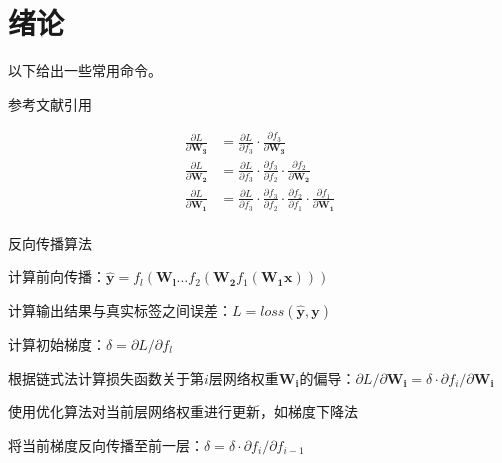 \chapter{绪论}

以下给出一些常用命令。

参考文献引用\cite{abdar_uncertainty_2021, baumgartner_exploration_2018, ackley_learning_1985}

\begin{equation}
    \label{equ:basic_chain_rule}
    \begin{split}
        \frac{\partial L}{\partial \boldsymbol{W_3}} &= \frac{\partial L}{\partial f_3} \cdot \frac{\partial f_3}{\partial \boldsymbol{W_3}} \\
        \frac{\partial L}{\partial \boldsymbol{W_2}} &= \frac{\partial L}{\partial f_3} \cdot \frac{\partial f_3}{\partial f_2} \cdot \frac{\partial f_2}{\partial \boldsymbol{W_2}}  \\
        \frac{\partial L}{\partial \boldsymbol{W_1}} &= \frac{\partial L}{\partial f_3} \cdot \frac{\partial f_3}{\partial f_2} \cdot \frac{\partial f_2}{\partial f_1} \cdot \frac{\partial f_1}{\partial \boldsymbol{W_1}} \\
    \end{split}
\end{equation}

\begin{algorithm}[!ht]
    \caption{反向传播算法}
    \label{alg:basic_back_propagation}

    
    计算前向传播：$\boldsymbol{\hat{y}} = f_l \left( \boldsymbol{W_l} \ldots f_2 \left( \boldsymbol{W_2} f_1 \left( \boldsymbol{W_1 x} \right) \right) \right)$
    
    计算输出结果与真实标签之间误差：$L = loss \left( \boldsymbol{\hat{y}}, \boldsymbol{y} \right)$
    
    计算初始梯度：$\delta = \partial L / \partial f_{l}$

    {
        根据链式法计算损失函数关于第$i$层网络权重$\boldsymbol{W_i}$的偏导：$\partial L / \partial \boldsymbol{W_i} = \delta \cdot \partial f_i / \partial \boldsymbol{W_i}$
        
        使用优化算法对当前层网络权重进行更新，如梯度下降法
        
        将当前梯度反向传播至前一层：$\delta = \delta \cdot \partial f_i / \partial f_{i-1}$
    }
\end{algorithm}

